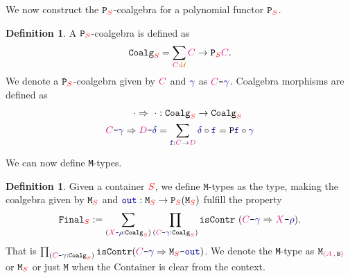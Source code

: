 \documentclass[twoside,11pt,openright]{report}
\theoremstyle{plain} %
\theoremstyle{definition}
\newtheorem{defn}[thm]{Definition}%
\theoremstyle{remark}
\newcommand*{\type}[1]{\textcolor{magenta!90!black}{#1}}
\newcommand*{\container}[1]{\textcolor{red}{#1}}
\newcommand*{\containerpair}[2]{\ensuremath{\colorlet{savedleftcolor}{.}\color{red}\left(\color{savedleftcolor}#1\,\textcolor{red}{\mathbf{,}}\,#2\color{red}\right)\color{savedleftcolor}}}
\newcommand*{\universe}[1]{\textcolor{orange!80!black}{#1}}
\newcommand*{\coalg}[2]{#1\texttt{-}#2}
\newcommand*{\function}[1]{\textcolor{blue!60!black}{\ensuremath{\mathtt{#1}}}}
\newcommand*{\typeformer}[1]{\ensuremath{\mathtt{#1}}}
\newcommand*{\functor}[1]{\ensuremath{\mathbf{\mathtt{#1}}}}
\begin{document}
\noindent We now construct the \(\functor{P}_{\container{S}}\)-coalgebra for a polynomial functor \(\functor{P}_{\container{S}}\).
\begin{defn}
  A \(\functor{P}_{\container{S}}\)-coalgebra is defined as
  \begin{equation}
    \typeformer{Coalg}_{\container{S}} = \sum_{\type{C} : \universe{\mathcal{U}}} \type{C} \rightarrow \functor{P}_{\container{S}}\type{C}.
  \end{equation}
  We denote a \(\functor{P}_{\container{S}}\)-coalgebra given by \(\type{C}\) and \(\function{\gamma}\) as \(\coalg{\type{C}}{\function{\gamma}}\). Coalgebra morphisms are defined as
  \begin{equation}
    \begin{aligned}
      \cdot \Rightarrow ~\cdot &: \typeformer{Coalg}_{\container{S}} \rightarrow \typeformer{Coalg}_{\container{S}} \\
      \coalg{\type{C}}{\function{\gamma}} \Rightarrow \coalg{\type{D}}{\function{\delta}} &= \sum_{\function{f} : \type{C} \rightarrow \type{D}} \function{\delta} \circ \function{f} = \functor{P} \function{f} \circ \function{\gamma}
    \end{aligned}
  \end{equation}
\end{defn}
\noindent We can now define \texttt{M}-types.
\begin{defn}
  Given a container \(\container{S}\), we define \(\mathtt{M}\)-types as the type, making the coalgebra given by \(\typeformer{M}_{\container{S}}\) and \(\function{out} : \typeformer{M}_{\container{S}} \rightarrow \functor{P}_{\container{S}}(\typeformer{M}_{\container{S}})\) fulfill the property
  \begin{equation}
    \typeformer{Final}_{\container{S}} := \sum_{(\coalg{\type{X}}{\function{\rho}} : \mathtt{Coalg}_{\container{S}})} \prod_{(\coalg{\type{C}}{\function{\gamma}} : \mathtt{Coalg}_{\container{S}})} \mathtt{isContr}~(\coalg{\type{C}}{\function{\gamma}} \Rightarrow \coalg{\type{X}}{\function{\rho}}).
  \end{equation}
  That is \(\prod_{(\coalg{\type{C}}{\function{\gamma}} : \mathtt{Coalg}_{\container{S}})} \mathtt{isContr}(\coalg{\type{C}}{\function{\gamma}} \Rightarrow \coalg{\typeformer{M}_{\container{S}}}{\function{out}})\). We denote the \texttt{M}-type as \(\typeformer{M}_{\containerpair{\type{A}}{\typeformer{B}}}\) or \(\typeformer{M}_{\container{S}}\) or just \(\typeformer{M}\) when the Container is clear from the context.
\end{defn}
\end{document}
